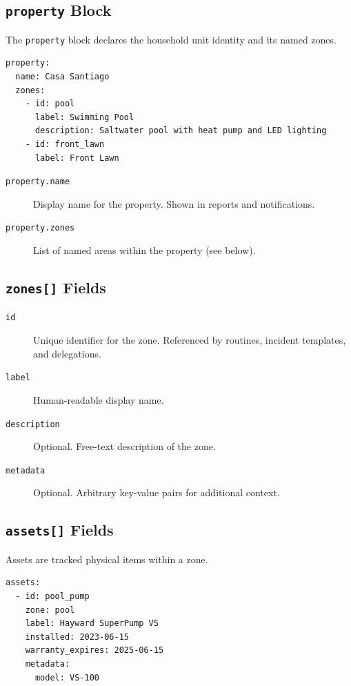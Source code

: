 \subsection{\texttt{property} Block}

The \texttt{property} block declares the household unit identity and its named zones.

\begin{verbatim}
property:
  name: Casa Santiago
  zones:
    - id: pool
      label: Swimming Pool
      description: Saltwater pool with heat pump and LED lighting
    - id: front_lawn
      label: Front Lawn
\end{verbatim}

\begin{description}
  \item[\texttt{property.name}] Display name for the property. Shown in reports and
        notifications.
  \item[\texttt{property.zones}] List of named areas within the property (see below).
\end{description}

\subsection{\texttt{zones[]} Fields}

\begin{description}
  \item[\texttt{id}] Unique identifier for the zone. Referenced by routines,
        incident templates, and delegations.
  \item[\texttt{label}] Human-readable display name.
  \item[\texttt{description}] Optional. Free-text description of the zone.
  \item[\texttt{metadata}] Optional. Arbitrary key-value pairs for additional context.
\end{description}

\subsection{\texttt{assets[]} Fields}

Assets are tracked physical items within a zone.

\begin{verbatim}
assets:
  - id: pool_pump
    zone: pool
    label: Hayward SuperPump VS
    installed: 2023-06-15
    warranty_expires: 2025-06-15
    metadata:
      model: VS-100
\end{verbatim}

